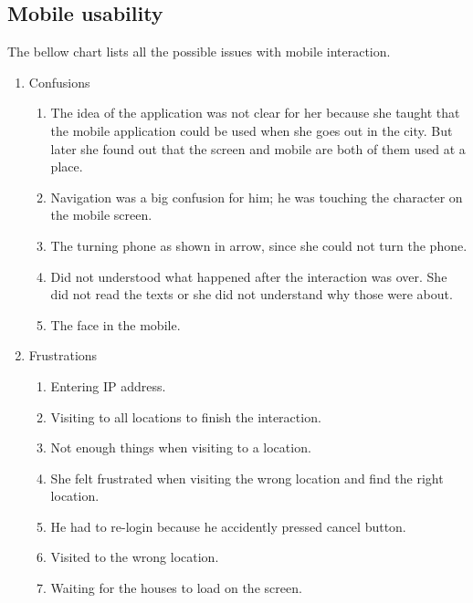 \subsection{Mobile usability}
The bellow chart lists all the possible issues with mobile interaction.

\begin{enumerate}

\item Confusions
\begin{enumerate}
\item  The idea of the application was not clear for her because she taught that the mobile application could be used when she goes out in the city. But later she found out that the screen and mobile are both of them used at a place.
\item  Navigation was a big confusion for him; he was touching the character on the mobile screen.
\item  The turning phone as shown in arrow, since she could not turn the phone.
\item  Did not understood what happened after the interaction was over. She did not read the texts or she did not understand why those were about.
\item  The face in the mobile.
\end{enumerate}

\item Frustrations
\begin{enumerate}
\item  Entering IP address.
\item  Visiting to all locations to finish the interaction.
\item  Not enough things when visiting to a location.
\item  She felt frustrated when visiting the wrong location and find the right location.
\item  He had to re-login because he accidently pressed cancel button.
\item  Visited to the wrong location.
\item  Waiting for the houses to load on the screen.
\end{enumerate}


\end{enumerate}
